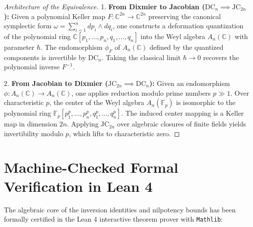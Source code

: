 \documentclass[11pt,a4paper]{article}
\theoremstyle{definition}
\begin{document}
\begin{proof}[Architecture of the Equivalence]
1. \textbf{From Dixmier to Jacobian ($\mathrm{DC}_n \implies \mathrm{JC}_{2n}$):}
Given a polynomial Keller map $F: \mathbb{C}^{2n} \to \mathbb{C}^{2n}$ preserving the canonical symplectic form $\omega = \sum_{i=1}^n dp_i \wedge dq_i$, one constructs a deformation quantization of the polynomial ring $\mathbb{C}[p_1, \dots, p_n, q_1, \dots, q_n]$ into the Weyl algebra $A_n(\mathbb{C})$ with parameter $\hbar$.
The endomorphism $\phi_F$ of $A_n(\mathbb{C})$ defined by the quantized components is invertible by $\mathrm{DC}_n$. Taking the classical limit $\hbar \to 0$ recovers the polynomial inverse $F^{-1}$.

2. \textbf{From Jacobian to Dixmier ($\mathrm{JC}_{2n} \implies \mathrm{DC}_n$):}
Given an endomorphism $\phi: A_n(\mathbb{C}) \to A_n(\mathbb{C})$, one applies reduction modulo prime numbers $p \gg 1$. Over characteristic $p$, the center of the Weyl algebra $A_n(\mathbb{F}_p)$ is isomorphic to the polynomial ring $\mathbb{F}_p[p_1^p, \dots, p_n^p, q_1^p, \dots, q_n^p]$. The induced center mapping is a Keller map in dimension $2n$. Applying $\mathrm{JC}_{2n}$ over algebraic closures of finite fields yields invertibility modulo $p$, which lifts to characteristic zero.
\end{proof}

\section{Machine-Checked Formal Verification in Lean 4}\label{sec:lean_formalization}

The algebraic core of the inversion identities and nilpotency bounds has been formally certified in the Lean 4 interactive theorem prover with \texttt{Mathlib}:
\end{document}
